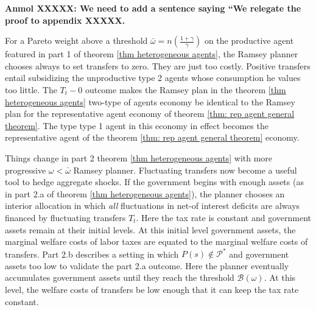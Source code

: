 \documentclass[thmsb,11pt]{article}
\begin{document}
\textbf{Anmol XXXXX: We need to add a sentence saying ``We relegate the proof to appendix XXXXX.}

For a Pareto weight above a
threshold $\bar{\omega}=n\left(\frac{1+\gamma}{\gamma}\right)$ on the productive agent featured in part 1 of theorem \ref{thm heterogeneous agents}, the Ramsey  planner chooses always to set transfers to zero.
They are just too costly.      Positive  transfers  entail subsidizing the unproductive type 2 agents
whose consumption he values too little.
The $T_t - 0$ outcome  makes  the Ramsey  plan
in the theorem \ref{thm heterogeneous agents} two-type of agents economy be  identical to the Ramsey plan for the representative agent economy
of theorem \ref{thm: rep agent general theorem}. %
The type type 1 agent in this economy
in effect becomes the representative agent of the theorem \ref{thm: rep agent general theorem} economy.

\color{black}
 Things change in part 2  theorem \ref{thm heterogeneous agents} with more progressive  $\omega<\bar{\omega}$ Ramsey planner.
Fluctuating transfers  now become a useful  tool to  hedge aggregate shocks.
  If the government begins with enough assets (as in part 2.a of  theorem \ref{thm heterogeneous agents}),
   the planner
  chooses an interior allocation in which {\em all} fluctuations in net-of interest deficits are always financed by fluctuating transfers $T_t$.
   Here  the tax rate is  constant and government assets remain at their initial levels. At this initial  level government assets,
    the marginal welfare costs of labor taxes are equated
 to the marginal welfare costs of transfers. Part 2.b describes a setting in which  $P(s)\not \in \mathcal{P}^*$ and government assets too low to validate the part 2.a outcome.  Here the planner eventually accumulates government  assets until they reach the threshold $\mathcal{B}(\omega)$.  At this level,
the welfare  costs of transfers be  low enough that it can  keep the tax rate constant.
\end{document}
